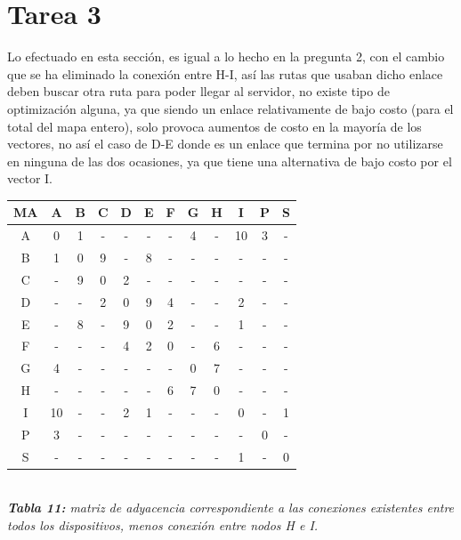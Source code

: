 \documentclass[letterpaper,10pt,onecolumn,titlepage]{article}
\begin{document}
\section{Tarea 3}

Lo efectuado en esta sección, es igual a lo hecho en la pregunta 2, con el cambio que se ha eliminado la conexión entre H-I, así las rutas que usaban dicho enlace deben buscar otra ruta para poder llegar al servidor, no existe tipo de optimización alguna, ya que siendo un enlace relativamente de bajo costo (para el total del mapa entero), solo provoca aumentos de costo en la mayoría de los vectores, no así el caso de D-E donde es un enlace que termina por no utilizarse en ninguna de las dos ocasiones, ya que tiene una alternativa de bajo costo por el vector I.

\begin{center}
   \begin{tabular}{|c|c|c|c|c|c|c|c|c|c|c|c|} \hline
     MA & A  & B & C & D & E & F & G & H & I  & P & S \\ \hline
     A  & 0  & 1 & - & - & - & - & 4 & - & 10 & 3 & - \\ \hline
     B  & 1  & 0 & 9 & - & 8 & - & - & - & -  & - & - \\ \hline
     C  & -  & 9 & 0 & 2 & - & - & - & - & -  & - & - \\ \hline
     D  & -  & - & 2 & 0 & 9 & 4 & - & - & 2  & - & - \\ \hline
     E  & -  & 8 & - & 9 & 0 & 2 & - & - & 1  & - & - \\ \hline
     F  & -  & - & - & 4 & 2 & 0 & - & 6 & -  & - & - \\ \hline
     G  & 4  & - & - & - & - & - & 0 & 7 & -  & - & - \\ \hline
     H  & -  & - & - & - & - & 6 & 7 & 0 & -  & - & - \\ \hline
     I  & 10 & - & - & 2 & 1 & - & - & - & 0  & - & 1 \\ \hline
     P  & 3  & - & - & - & - & - & - & - & -  & 0 & - \\ \hline
     S  & -  & - & - & - & - & - & - & - & 1  & - & 0 \\ \hline
   \end{tabular}\\
   \textit{\textbf{Tabla 11:} matriz de adyacencia correspondiente a las conexiones existentes entre todos los dispositivos, menos conexión entre nodos H e I.}
 \end{center}

\newpage
\end{document}
